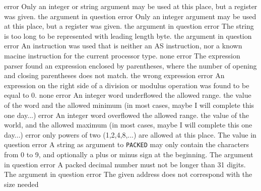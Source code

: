 \documentclass[12pt,twoside]{report}
\newcommand{\asname}{{AS}}
\begin{document}
\begin{description}
               {error}
               {Only an integer or string argument may be used at this place,
                but a register was given.}
               {the argument in question}
               {error}
               {Only an integer argument may be used at this place,
                but a register was given.}
               {the argument in question}
               {error}
               {The string is too long to be represented with leading
                length byte.}
               {the argument in question}
               {error}
               {An instruction was used that is neither an \asname{} instruction, nor a
                known macine instruction for the current processor type.}
               {none}
               {error}
               {The expression parser found an expression enclosed by
                parentheses, where the number of opening and closing
                parentheses does not match.}
               {the wrong expression}
               {error}
               {An expression on the right side of a division or modulus
                operation was found to be equal to 0.}
               {none}
               {error}
               {An integer word underflowed the allowed range.}
               {the value of the word and the allowed minimum (in most
                cases, maybe I will complete this one day...)}
               {error}
               {An integer word overflowed the allowed range.}
               {the value of the world, and the allowed maximum (in most
                cases, maybe I will complete this one day...)}
               {error}
               {only powers of two (1,2,4,8,...) are allowed at this place.}
               {The value in question}
               {error}
               {A string as argument to {\tt PACKED} may only contain the
                characters from 0 to 9, and optionally a plus or minus
                sign at the beginning.}
               {The argument in question}
               {error}
               {A packed decimal number must not be longer than 31 digits.}
               {The argument in question}
               {error}
               {The given address does not correspond with the size needed
}
\end{description}
\end{document}
